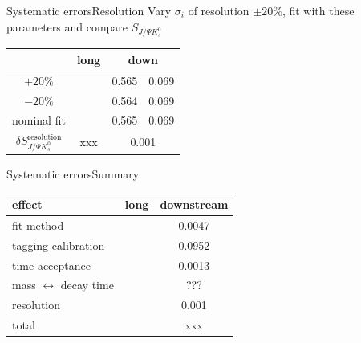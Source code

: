 \documentclass{beamer}
\newcommand{\SJPsi}{S_{J/\Psi K_s^0}}
\begin{document}
\begin{frame}{Systematic errors}{Resolution}
Vary $\sigma_i$ of resolution $\pm 20\%$, fit with these parameters and compare $\SJPsi$
\begin{center}
\begin{tabular}{c r@{$\pm$}l r@{$\pm$}l}
\hline \hline
 & \multicolumn{2}{c}{long} & \multicolumn{2}{c}{down} \\ \hline
$+20\%$ & & & 0.565 & 0.069 \\
$-20\%$ & & & 0.564 & 0.069 \\ \hline
nominal fit & & & 0.565 & 0.069 \\ \hline
$\delta\SJPsi^{\text{resolution}}$ & \multicolumn{2}{c}{xxx} & \multicolumn{2}{c}{0.001} \\
\hline \hline
\end{tabular}
\end{center}
\end{frame}

\begin{frame}{Systematic errors}{Summary}
\begin{center}
\begin{tabular}{l c c}
\hline \hline
effect & long & downstream \\ \hline
fit  method & & 0.0047\\
tagging calibration & & 0.0952\\
time acceptance & & 0.0013\\
mass $\leftrightarrow$ decay time & & ??? \\
resolution & & 0.001 \\ \hline
total & & xxx \\
\hline \hline
\end{tabular}
\end{center}
\end{frame}
\end{document}
